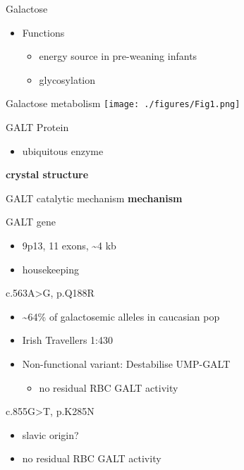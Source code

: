 \documentclass[presentation, smaller]{beamer}
\begin{document}
\begin{frame}[label={sec:orgheadline2}]{Galactose}
\begin{itemize}
\item Functions
\begin{itemize}
\item energy source in pre-weaning infants
\item glycosylation
\end{itemize}
\end{itemize}
\end{frame}

\begin{frame}[label={sec:orgheadline3}]{Galactose metabolism}
\texttt{[image: ./figures/Fig1.png]}
\end{frame}

\begin{frame}[label={sec:orgheadline4}]{GALT Protein}
\begin{itemize}
\item ubiquitous enzyme
\end{itemize}

\textbf{crystal structure}
\end{frame}

\begin{frame}[label={sec:orgheadline5}]{GALT catalytic mechanism}
\textbf{mechanism}
\end{frame}

\begin{frame}[label={sec:orgheadline6}]{GALT gene}
\begin{itemize}
\item 9p13, 11 exons, \textasciitilde{}4 kb
\item housekeeping
\end{itemize}
\begin{block}{c.563A>G, p.Q188R}
\begin{itemize}
\item \textasciitilde{}64\% of galactosemic alleles in caucasian pop
\item Irish Travellers 1:430
\item Non-functional variant: Destabilise UMP-GALT
\begin{itemize}
\item no residual RBC GALT activity
\end{itemize}
\end{itemize}
\end{block}

\begin{block}{c.855G>T, p.K285N}
\begin{itemize}
\item slavic origin?
\item no residual RBC GALT activity
\end{itemize}
\end{block}
\end{frame}
\end{document}
